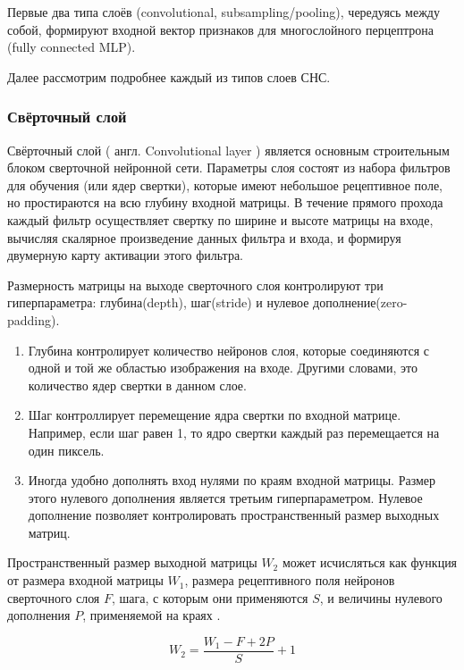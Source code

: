 \documentclass[14pt]{article}
\numberwithin{figure}{section}
\numberwithin{equation}{section}
\begin{document}
Первые два типа слоёв (convolutional, subsampling/pooling), чередуясь между собой, формируют входной вектор признаков для многослойного перцептрона (fully connected MLP).

Далее рассмотрим подробнее каждый из типов слоев СНС.

\subsubsection{Свёрточный слой}

Свёрточный слой ( англ. Convolutional layer ) является основным строительным блоком сверточной нейронной сети. Параметры слоя состоят из набора фильтров для обучения (или ядер свертки), которые имеют небольшое рецептивное поле, но простираются на всю глубину входной матрицы. В течение прямого прохода каждый фильтр осуществляет свертку по ширине и высоте матрицы на входе, вычисляя скалярное произведение данных фильтра и входа, и формируя двумерную карту активации этого фильтра.

Размерность матрицы на выходе сверточного слоя контролируют три гиперпараметра: глубина(depth), шаг(stride) и нулевое дополнение(zero-padding).

\begin{enumerate}
	\item
	Глубина контролирует количество нейронов слоя, которые соединяются с одной и той же областью изображения на входе. Другими словами, это количество ядер свертки в данном слое.
	\item
	Шаг контроллирует перемещение ядра свертки по входной матрице. Например, если шаг равен 1, то ядро свертки каждый раз перемещается на один пиксель.
	\item
	Иногда удобно дополнять вход нулями по краям входной матрицы. Размер этого нулевого дополнения является третьим гиперпараметром. Нулевое дополнение позволяет контролировать пространственный размер выходных матриц.
\end{enumerate}

Пространственный размер выходной матрицы $W_2$ может исчисляться как функция от размера входной матрицы $W_1$, размера рецептивного поля нейронов сверточного слоя $F$, шага, с которым они применяются $S$, и величины нулевого дополнения $P$, применяемой на краях \cite{Stanford}.

\begin{equation}
	W_2 = \frac{W_1 - F + 2P}{S} + 1
\end{equation}
\end{document}
